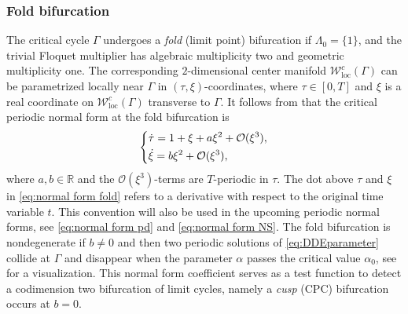 \documentclass[english]{myarticle}
\DeclareMathOperator{\loc}{loc}
\begin{document}
\begin{sloppypar}
\subsubsection{Fold bifurcation}
The critical cycle $\Gamma$ undergoes a \emph{fold} (limit point) bifurcation if $\Lambda_0 = \{1\}$, and the trivial Floquet multiplier has algebraic multiplicity two and geometric multiplicity one. The corresponding $2$-dimensional center manifold $\mathcal{W}_{\loc}^{c}(\Gamma)$ can be parametrized locally near $\Gamma$ in $(\tau,\xi)$-coordinates, where $\tau \in [0,T]$ and $\xi$ is a real coordinate on $\mathcal{W}_{\loc}^{c}(\Gamma)$ transverse to $\Gamma$. It follows from \cite[Theorem 25]{Article2} that the critical periodic normal form at the fold bifurcation is 
\begin{equation} \label{eq:normal form fold}
    \begin{dcases}
    \dot{\tau} = 1 + \xi + a\xi^2 + \mathcal{O}(\xi^3),\\
    \dot{\xi} = b\xi^2 + \mathcal{O}(\xi^3),
    \end{dcases}
\end{equation}
where $a,b \in \mathbb{R}$ and the $\mathcal{O}(\xi^3)$-terms are $T$-periodic in $\tau$. The dot above $\tau$ and $\xi$ in \eqref{eq:normal form fold} refers to a derivative with respect to the original time variable $t$. This convention will also be used in the upcoming periodic normal forms, see \eqref{eq:normal form pd} and \eqref{eq:normal form NS}. The fold bifurcation is nondegenerate if $b\neq 0$ and then two periodic solutions of \eqref{eq:DDEparameter} collide at $\Gamma$ and disappear when the parameter $\alpha$ passes the critical value $\alpha_0$, see \cite[Figure 5.19]{Kuznetsov2023a} for a visualization. This normal form coefficient serves as a test function to detect a codimension two bifurcation of limit cycles, namely a \emph{cusp} (CPC) bifurcation occurs at $b=0$. 


\end{sloppypar}
\end{document}
